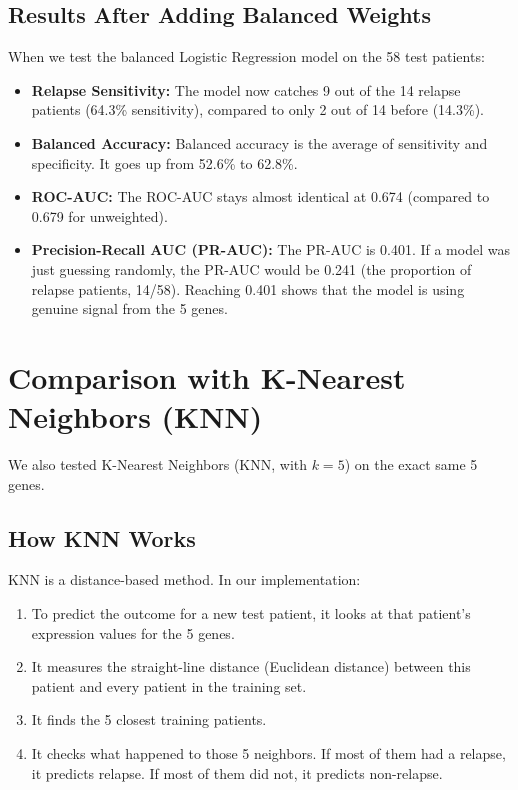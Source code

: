 \documentclass[11pt,a4paper]{article}
\begin{document}
\subsection{Results After Adding Balanced Weights}
When we test the balanced Logistic Regression model on the 58 test patients:
\begin{itemize}
    \item \textbf{Relapse Sensitivity:} The model now catches 9 out of the 14 relapse patients (64.3\% sensitivity), compared to only 2 out of 14 before (14.3\%).
    \item \textbf{Balanced Accuracy:} Balanced accuracy is the average of sensitivity and specificity. It goes up from 52.6\% to 62.8\%.
    \item \textbf{ROC-AUC:} The ROC-AUC stays almost identical at 0.674 (compared to 0.679 for unweighted).
    \item \textbf{Precision-Recall AUC (PR-AUC):} The PR-AUC is 0.401. If a model was just guessing randomly, the PR-AUC would be 0.241 (the proportion of relapse patients, 14/58). Reaching 0.401 shows that the model is using genuine signal from the 5 genes.
\end{itemize}

\section{Comparison with K-Nearest Neighbors (KNN)}

We also tested K-Nearest Neighbors (KNN, with $k=5$) on the exact same 5 genes.

\subsection{How KNN Works}
KNN is a distance-based method. In our implementation:
\begin{enumerate}
    \item To predict the outcome for a new test patient, it looks at that patient's expression values for the 5 genes.
    \item It measures the straight-line distance (Euclidean distance) between this patient and every patient in the training set.
    \item It finds the 5 closest training patients.
    \item It checks what happened to those 5 neighbors. If most of them had a relapse, it predicts relapse. If most of them did not, it predicts non-relapse.
\end{enumerate}
\end{document}
